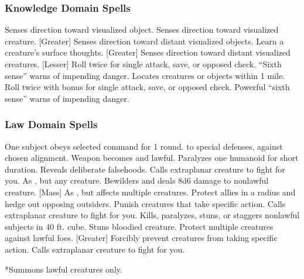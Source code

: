 \subsubsection{Knowledge Domain Spells}

\begin{spelllist}
     Senses direction toward visualized object.
    \spellhead[1]{}
     Senses direction toward visualized creature.
    \spellhead[2]{}
    [Greater] Senses direction toward distant visualized objects.
     Learn a creature's surface thoughts.
    [Greater] Senses direction toward distant visualized creatures.
    [Lesser] Roll twice for single attack, save, or opposed check.
     ``Sixth sense'' warns of impending danger.
    \spellhead[5]{}
     Locates creatures or objects within 1 mile.
    \spellhead[7]{}
     Roll twice with bonus for single attack, save, or opposed check.
    \spellhead[8]{}
    \spellhead[8]{}
     Powerful ``sixth sense'' warns of impending danger.
\end{spelllist}

\subsubsection{Law Domain Spells}

\begin{spelllist}
     One subject obeys selected command for 1 round.
      to special defenses,  against chosen alignment.
     Weapon becomes  and lawful.
     Paralyzes one humanoid for short duration.
     Reveals deliberate falsehoods.
     Calls extraplanar creature to fight for you.
     As , but any creature.
     Bewilders and deals 8d6 damage to nonlawful creature.
    [Mass] As , but affects multiple creatures.
     Protect allies in a \areamed radius and hedge out opposing outsiders.
     Punish creatures that take specific action.
     Calls extraplanar creature to fight for you.
     Kills, paralyzes, stuns, or staggers nonlawful subjects in 40 ft. cube.
    \spellhead[7]{}
     Stuns bloodied creature.
    \F Protect multiple creatures against lawful foes.
    [Greater] Forcibly prevent creatures from taking specific action.
     Calls extraplanar creature to fight for you.
\end{spelllist}
*Summons lawful creatures only.

